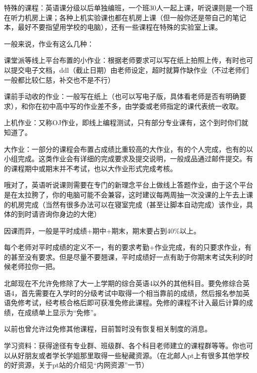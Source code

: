 特殊的课程：英语课分级以后单独编班，一个班30人一起上课，听说课则是一个班在听力机房上课；各种上机实验课也都在机房上课（但一般你还是带自己的笔记本，最好不要指望用学校的电脑），还有一些课程在特殊的实验室上课。


一般来说，作业有这么几种：

课堂派等线上平台布置的小作业：根据老师要求可以写在纸上拍照上传，有时也可以提交电子文档，ddl（截止日期）由老师设定，超时就算作缺作业（不过老师们一般都比较仁慈，补交也不是不行）

课前手动收的作业：一般写在纸上（也可以写电子版，具体看老师是否有明确要求），和你在初中高中写的作业差不多，由学委或老师指定的课代表统一收取。

上机作业：又称OJ作业，即线上编程测试，只有部分专业课有，这个到时你们就知道了。

大作业：一部分的课程会布置占成绩比重较高的大作业，有的个人完成，也有的以小组完成。这类作业会有详细的完成要求及提交说明，一般成品通过邮件提交。有的课程期中或期末并不考试，也以大作业形式完成考核。

哦对了，英语听说课则需要在专门的新理念平台上做线上答题作业，由于这个平台是在太拉胯了，你的电脑可能不会兼容，这时建议每两周抽一次没课的上午去上课的机房完成（当然有很多办法可以在寝室完成（甚至让脚本自动完成）该作业，具体的到时请咨询你身边的大佬）



因课而异，一般是平时成绩+期中+期末，期末要占到40\%以上。

每个老师对平时成绩的定义不一，有的要求考勤+作业完成，有的只要求作业，有的甚至没有要求。但是尽量不要翘课，平时成绩好一点有助于你期末考试失利的时候老师拉你一把。


北邮现在不允许免修除了大一上学期的综合英语4以外的其他科目。要免修综合英语4，首先需要在入学时的分级考试中取得一个相当靠前的成绩，然后报名参加英语免修考试，经考核合格后即可获准免修此课程。免修的课程不计入最后计算的成绩，在成绩单上显示为“免修”。

以前也曾允许过免修其他课程，目前暂时没有恢复相关制度的消息。


学习资料：获得途径有专业群、班级群、各个科目老师建立的课程群等等。你也可以从好朋友或者学长学姐那里取得一些秘藏资源。（在北邮人pt上有很多其他学校的好资源，关于pt站的介绍见“内网资源”一节）


